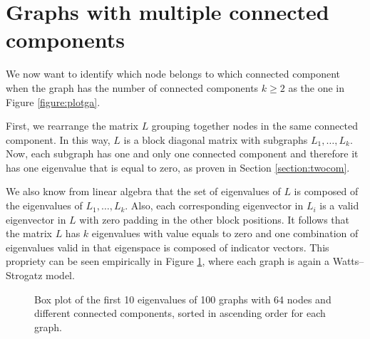 \documentclass{article}
\begin{document}
\section{Graphs with multiple connected components} \label{section:multiplecom}
We now want to identify which node belongs to which connected component
when the graph has the number of connected components $k \geq 2$
as the one in Figure \ref{figure:plotga}.

First, we rearrange the matrix $L$ grouping together nodes in the same connected component.
In this way, $L$ is a block diagonal matrix with subgraphs $L_1, \dots, L_k$.
Now, each subgraph has one and only one connected component
and therefore it has one eigenvalue that is equal to zero,
as proven in Section \ref{section:twocom}.

We also know from linear algebra that the set of eigenvalues of $L$
is composed of the eigenvalues of $L_1, \dots, L_k$.
Also, each corresponding eigenvector in $L_i$ is a valid eigenvector in $L$ with zero padding
in the other block positions.
It follows that the matrix $L$ has $k$ eigenvalues with value equals to zero and
one combination of eigenvalues valid in that eigenspace is composed of indicator vectors.
This propriety can be seen empirically in Figure \ref{figure:mcomp},
where each graph is again a Watts–Strogatz model.

\begin{figure}[hb]
    \hfill
    \hfill
    \hfill
    \hfill
    \label{figure:mcomp}
    \caption{Box plot of the first 10 eigenvalues of 100 graphs with 64 nodes and different connected components, sorted in ascending order for each graph.}
\end{figure}
\end{document}
